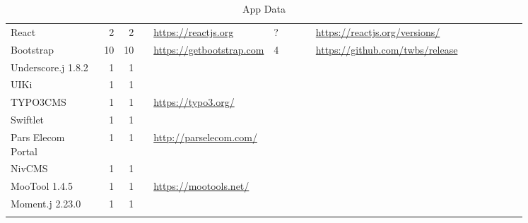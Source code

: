 \begin{longtable}{|p{0.2\linewidth}|r|r|r|p{0.2\linewidth}|p{0.1\linewidth}|p{0.2\linewidth}|p{0.15\linewidth}|}
	React &2 &2 & &\url{https://reactjs.org} &? &\url{https://reactjs.org/versions/} \\
	Bootstrap &10 &10 & &\url{https://getbootstrap.com} &4 &\url{https://github.com/twbs/release} \\
	Underscore.j 1.8.2 &1 &1 & & & & \\
	UIKi &1 &1 & & & & \\
	TYPO3CMS &1 &1 & &\url{https://typo3.org/} & & \\
	Swiftlet &1 &1 & & & & \\
	Pars Elecom Portal &1 &1 & &\url{http://parselecom.com/} & & \\
	NivCMS &1 &1 & & & & \\
	MooTool 1.4.5 &1 &1 & &\url{https://mootools.net/} & & \\
	Moment.j 2.23.0 &1 &1 & & & & \\
	\bottomrule
	\caption{App Data}\label{tab: }
\end{longtable}
